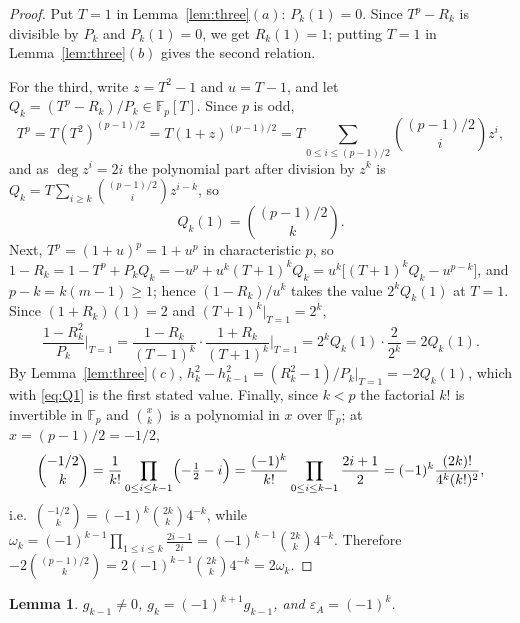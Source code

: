 \documentclass[11pt]{amsart}
\newtheorem{lemma}[theorem]{Lemma}
\theoremstyle{remark}
\newcommand{\Fp}{\mathbb F_p}
\begin{document}
\begin{proof}
Put $T=1$ in Lemma~\ref{lem:three}$(a)$: $P_k(1)=0$. Since $T^p-R_k$ is divisible by $P_k$ and
$P_k(1)=0$, we get $R_k(1)=1$; putting $T=1$ in Lemma~\ref{lem:three}$(b)$ gives the second
relation.

For the third, write $z=T^2-1$ and $u=T-1$, and let $Q_k=(T^p-R_k)/P_k\in\Fp[T]$. Since $p$ is odd,
\[
 T^p=T(T^2)^{(p-1)/2}=T(1+z)^{(p-1)/2}=T\sum_{0\le i\le(p-1)/2}\binom{(p-1)/2}{i}z^i,
\]
and as $\deg z^i=2i$ the polynomial part after division by $z^k$ is
$Q_k=T\sum_{i\ge k}\binom{(p-1)/2}{i}z^{i-k}$, so
\begin{equation}\label{eq:Q1}
 Q_k(1)=\binom{(p-1)/2}{k}.
\end{equation}
Next, $T^p=(1+u)^p=1+u^p$ in characteristic $p$, so
$1-R_k=1-T^p+P_kQ_k=-u^p+u^k(T+1)^kQ_k=u^k\bigl[(T+1)^kQ_k-u^{p-k}\bigr]$, and $p-k=k(m-1)\ge1$;
hence $(1-R_k)/u^k$ takes the value $2^kQ_k(1)$ at $T=1$. Since $(1+R_k)(1)=2$ and
$(T+1)^k\big|_{T=1}=2^k$,
\[
 \frac{1-R_k^2}{P_k}\bigg|_{T=1}
 =\frac{1-R_k}{(T-1)^k}\cdot\frac{1+R_k}{(T+1)^k}\bigg|_{T=1}
 =2^kQ_k(1)\cdot\frac{2}{2^k}=2Q_k(1).
\]
By Lemma~\ref{lem:three}$(c)$, $h_k^2-h_{k-1}^2=(R_k^2-1)/P_k\big|_{T=1}=-2Q_k(1)$, which with
\eqref{eq:Q1} is the first stated value. Finally, since $k<p$ the factorial $k!$ is invertible in
$\Fp$ and $\binom{x}{k}$ is a polynomial in $x$ over $\Fp$; at $x=(p-1)/2=-1/2$,
\[
 \binom{-1/2}{k}=\frac{1}{k!}\prod_{0\le i\le k-1}\Bigl(-\tfrac12-i\Bigr)
 =\frac{(-1)^k}{k!}\prod_{0\le i\le k-1}\frac{2i+1}{2}
 =(-1)^k\frac{(2k)!}{4^k(k!)^2},
\]
i.e.\ $\binom{-1/2}{k}=(-1)^k\binom{2k}{k}4^{-k}$, while
$\omega_k=(-1)^{k-1}\prod_{1\le i\le k}\frac{2i-1}{2i}=(-1)^{k-1}\binom{2k}{k}4^{-k}$.
Therefore $-2\binom{(p-1)/2}{k}=2(-1)^{k-1}\binom{2k}{k}4^{-k}=2\omega_k$.
\end{proof}

\begin{lemma}\label{lem:eps}
$g_{k-1}\ne0$, \quad $g_k=(-1)^{k+1}g_{k-1}$, \quad and $\varepsilon_A=(-1)^k$.
\end{lemma}
\end{document}
